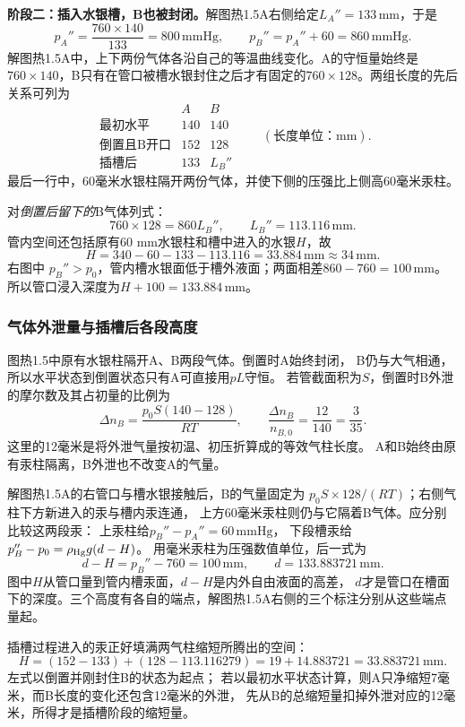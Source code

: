 \documentclass[UTF8,fontset=fandol,a4paper,11pt]{ctexart}
\newcommand{\result}[1]{\begin{equation*}\boxed{#1}\end{equation*}}
\begin{document}
\textbf{阶段二：插入水银槽，B也被封闭。}解图热1.5A右侧给定$L_A''=133\,\mathrm{mm}$，于是
\[p_A''=\frac{760\times140}{133}=800\,\mathrm{mmHg},\qquad
p_B''=p_A''+60=860\,\mathrm{mmHg}.\]
解图热1.5A中，上下两份气体各沿自己的等温曲线变化。A的守恒量始终是$760\times140$，B只有在管口被槽水银封住之后才有固定的$760\times128$。两组长度的先后关系可列为
\[\begin{array}{c|cc}
&A&B\\\hline
\text{最初水平}&140&140\\
\text{倒置且B开口}&152&128\\
\text{插槽后}&133&L_B''
\end{array}\qquad(\text{长度单位：mm}).\]
最后一行中，60毫米水银柱隔开两份气体，并使下侧的压强比上侧高60毫米汞柱。

对\emph{倒置后留下的}B气体列式：
\[760\times128=860L_B'',\qquad L_B''=113.116\,\mathrm{mm}.\]
管内空间还包括原有60 mm水银柱和槽中进入的水银$H$，故
\result{H=340-60-133-113.116=33.884\,\mathrm{mm}\approx34\,\mathrm{mm}.}
右图中 $p_B''>p_0$，管内槽水银面低于槽外液面；两面相差$860-760=100\,\mathrm{mm}$。所以管口浸入深度为$H+100=133.884\,\mathrm{mm}$。
\subsubsection*{气体外泄量与插槽后各段高度}
图热1.5中原有水银柱隔开A、B两段气体。倒置时A始终封闭，
B仍与大气相通，所以水平状态到倒置状态只有A可直接用$pL$守恒。
若管截面积为$S$，倒置时B外泄的摩尔数及其占初量的比例为
\[
\Delta n_B=\frac{p_0S(140-128)}{RT},\qquad
\frac{\Delta n_B}{n_{B,0}}=\frac{12}{140}=\frac3{35}.
\]
这里的12毫米是将外泄气量按初温、初压折算成的等效气柱长度。
A和B始终由原有汞柱隔离，B外泄也不改变A的气量。

解图热1.5A的右管口与槽水银接触后，B的气量固定为
$p_0S\times128/(RT)$；右侧气柱下方新进入的汞与槽内汞连通，
上方60毫米汞柱则仍与它隔着B气体。应分别比较这两段汞：
上汞柱给$p_B''-p_A''=60\,\mathrm{mmHg}$，
下段槽汞给$p_B''-p_0=\rho_{\rm Hg}g(d-H)$。
用毫米汞柱为压强数值单位，后一式为
\[
d-H=p_B''-760=100\,\mathrm{mm},\qquad
d=133.883721\,\mathrm{mm}.
\]
图中$H$从管口量到管内槽汞面，$d-H$是内外自由液面的高差，
$d$才是管口在槽面下的深度。三个高度有各自的端点，解图热1.5A右侧的三个标注分别从这些端点量起。

插槽过程进入的汞正好填满两气柱缩短所腾出的空间：
\[
H=(152-133)+(128-113.116279)
=19+14.883721=33.883721\,\mathrm{mm}.
\]
左式以倒置并刚封住B的状态为起点；
若以最初水平状态计算，则A只净缩短7毫米，而B长度的变化还包含12毫米的外泄，
先从B的总缩短量扣掉外泄对应的12毫米，所得才是插槽阶段的缩短量。
\end{document}
